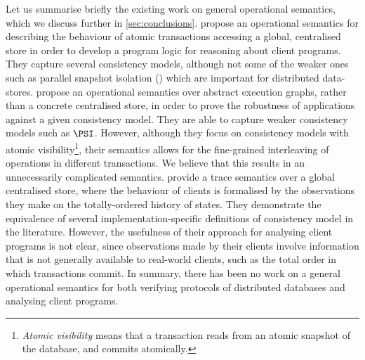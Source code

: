 Let us summarise briefly the existing work on general operational semantics, 
which we  
discuss further in \cref{sec:conclusions}.
\cite{alonetogether} propose an operational
semantics for describing the behaviour of  atomic transactions
accessing a global, centralised store 
in order to develop 
a program logic  for reasoning about client programs. They capture 
 several consistency models, although not some of the  weaker ones
 such as parallel snapshot isolation (\PSI)  \cite{PSI}
 which are important 
for distributed data-stores.
\cite{sureshConcur} propose an operational semantics over abstract
execution graphs, rather than   a concrete centralised store, in order to
prove the robustness of applications against
a given consistency model. They are able to 
capture weaker consistency models
such as \(\PSI\). However, although they focus on consistency models with atomic 
visibility\footnote{\emph{Atomic visibility} means that a transaction 
reads from an atomic snapshot of the database, and commits atomically.},
their semantics allows for the fine-grained interleaving of operations in different
transactions. We believe that this results  in an unnecessarily complicated semantics.
\cite{seebelieve} provide a trace semantics over a global
centralised store, where the behaviour of clients is formalised by the   
observations they make on the totally-ordered history of states. 
They 
demonstrate  the equivalence of several
implementation-specific definitions of
consistency model  in the literature. 
However, the usefulness  of their approach for analysing client programs is not clear, 
since observations made by their clients  involve information that is not generally 
available to real-world clients,  such as the total order in which transactions commit.
In summary, there has been no work on a general operational semantics 
for both verifying protocols of distributed databases and 
analysing  client programs. 


